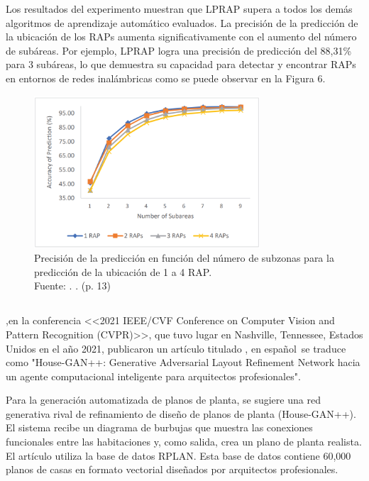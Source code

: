 Los resultados del experimento muestran que LPRAP supera a todos los demás algoritmos de aprendizaje automático evaluados. La precisión de la predicción de la ubicación de los RAPs aumenta significativamente con el aumento del número de subáreas. Por ejemplo, LPRAP logra una precisión de predicción del 88,31\% para 3 subáreas, lo que demuestra su capacidad para detectar y encontrar RAPs en entornos de redes inalámbricas como se puede observar en la Figura 6.

\begin{figure}[!ht]
	\begin{center}
		\includegraphics[width=0.75\textwidth]{2/figures/ketkha2022.png}
		\caption[Precisión de la predicción en función del número de subzonas para la predicción de la ubicación de 1 a 4 RAP.]{Precisión de la predicción en función del número de subzonas para la predicción de la ubicación de 1 a 4 RAP.\\
		Fuente: \cite{pr_ketkhaw2019deepl}. . (p. 13)}
		\label{2:fig114}
	\end{center}
\end{figure}

\subsection{}
\cite{pr_nauata2021housegan} ,en la conferencia <<2021 IEEE/CVF Conference on Computer Vision and Pattern Recognition (CVPR)>>, que tuvo lugar en Nashville, Tennessee, Estados Unidos en el año 2021, publicaron un artículo titulado , en español se traduce como "House-GAN++: Generative Adversarial Layout Refinement Network hacia un agente computacional inteligente para arquitectos profesionales".

Para la generaci\'on automatizada de planos de planta, se sugiere una red generativa rival de refinamiento de dise\~no de planos de planta (House-GAN++). El sistema recibe un diagrama de burbujas que muestra las conexiones funcionales entre las habitaciones y, como salida, crea un plano de planta realista. El art\'iculo utiliza la base de datos RPLAN. Esta base de datos contiene 60,000 planos de casas en formato vectorial dise\~nados por arquitectos profesionales.

